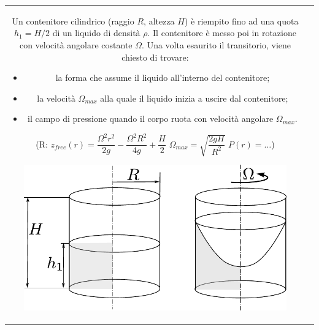 \noindent
\begin{tabular}{cc}
\begin{minipage}[l]{0.50\textwidth}
 \begin{exerciseS}
Un contenitore cilindrico (raggio $R$, altezza $H$) è riempito fino ad una 
 quota $h_1 =H/2$ di un liquido di densità $\rho$. Il contenitore è messo
 poi in rotazione con velocità angolare costante $\Omega$. 
Una volta esaurito il transitorio, viene chiesto di trovare:
\begin{itemize}
\item la forma che assume il liquido all’interno del contenitore;
\item la velocità $\Omega_{max}$ alla quale il liquido inizia a uscire dal contenitore;
\item il campo di pressione quando il corpo ruota con velocità angolare $\Omega_{max}$.
\end{itemize}
 \vspace{0.3cm}
(R: $z_{free}(r) = \dfrac{\Omega^2 r^2}{2 g} - \dfrac{\Omega^2 R^2}{4 g} + \dfrac{H}{2}$ \newline
 \hspace{0.5cm} $\Omega_{max} = \sqrt{\dfrac{2 g H}{R^2}} $ \newline
 \hspace{0.5cm} $P(r) = \dots$)
\end{exerciseS}
\end{minipage}
\hspace{3mm}
\begin{minipage}[r]{0.50\textwidth}
   \begin{center}
   \includegraphics[width=0.90\textwidth, trim = 0 0 0 0,clip]{./fig/vessel}
   \end{center}
\end{minipage}
\end{tabular}

